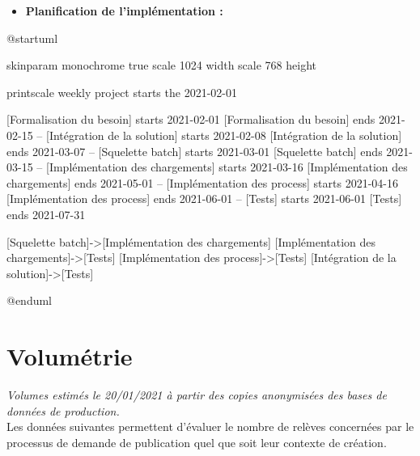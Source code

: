 \documentclass[a4paper, 12pt]{report}
\begin{document}
\begin{itemize}
  \item \textbf{Planification de l'implémentation :}\\
\end{itemize}

\begin{center}
  \begin{plantuml}
    @startuml

    skinparam monochrome true
    scale 1024 width
    scale 768 height

    printscale weekly
    project starts the 2021-02-01

    [Formalisation du besoin] starts 2021-02-01
    [Formalisation du besoin] ends 2021-02-15
    --
    [Intégration de la solution] starts 2021-02-08
    [Intégration de la solution] ends 2021-03-07
    --
    [Squelette batch] starts 2021-03-01
    [Squelette batch] ends 2021-03-15
    --
    [Implémentation des chargements] starts 2021-03-16
    [Implémentation des chargements] ends 2021-05-01
    --
    [Implémentation des process] starts 2021-04-16
    [Implémentation des process] ends 2021-06-01
    --
    [Tests] starts 2021-06-01
    [Tests] ends 2021-07-31

    [Squelette batch]->[Implémentation des chargements]
    [Implémentation des chargements]->[Tests]
    [Implémentation des process]->[Tests]
    [Intégration de la solution]->[Tests]

    @enduml
  \end{plantuml}
\end{center}

\chapter{Volumétrie}
\label{appendix:volumetrie}

\textit{Volumes estimés le 20/01/2021 à partir des copies anonymisées des bases de données de production.}\\

Les données suivantes permettent d'évaluer le nombre de relèves concernées par le processus de demande de publication quel que soit leur contexte de création.\\
\end{document}
